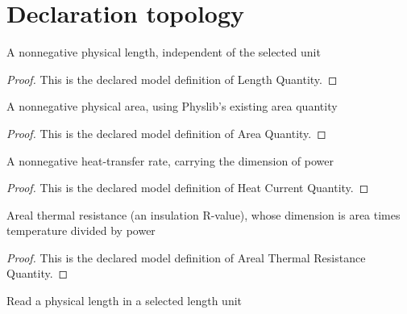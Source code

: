 \section{Declaration topology}
\begin{definition}
  \label{def:physics:phyx-mini-0487:phyxminiproblems-problemphyxmini0487-lengthquantity}
  A nonnegative physical length, independent of the selected unit
\end{definition}
\begin{proof}
  This is the declared model definition of Length Quantity.
\end{proof}
\begin{definition}
  \label{def:physics:phyx-mini-0487:phyxminiproblems-problemphyxmini0487-areaquantity}
  A nonnegative physical area, using Physlib's existing area quantity
\end{definition}
\begin{proof}
  This is the declared model definition of Area Quantity.
\end{proof}
\begin{definition}
  \label{def:physics:phyx-mini-0487:phyxminiproblems-problemphyxmini0487-heatcurrentquantity}
  A nonnegative heat-transfer rate, carrying the dimension of power
\end{definition}
\begin{proof}
  This is the declared model definition of Heat Current Quantity.
\end{proof}
\begin{definition}
  \label{def:physics:phyx-mini-0487:phyxminiproblems-problemphyxmini0487-arealthermalresistancequantity}
  Areal thermal resistance (an insulation R-value), whose dimension is area times temperature divided by power
\end{definition}
\begin{proof}
  This is the declared model definition of Areal Thermal Resistance Quantity.
\end{proof}
\begin{definition}
  \label{def:physics:phyx-mini-0487:phyxminiproblems-problemphyxmini0487-lengthreadout}
  Read a physical length in a selected length unit
\end{definition}
